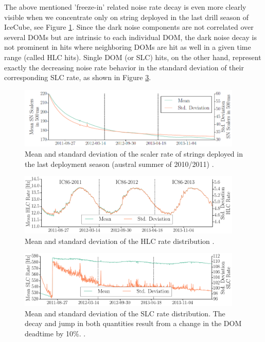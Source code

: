 The above mentioned 'freeze-in' related noise rate decay is even more clearly visible when we concentrate only on string deployed in the last drill season of IceCube, see Figure \ref{fig:noise_over_time_briedel_lastseasondepoyed}. Since the dark noise components are not correlated over several DOMs but are intrinsic to each individual DOM, the dark noise decay is not prominent in hits where neighboring DOMs are hit as well in a given time range (called HLC hits). Single DOM (or SLC) hits, on the other hand, represent exactly the decreasing noise rate behavior in the standard deviation of their corresponding SLC rate, as shown in Figure \ref{fig:slc_over_time_briedel}.

\begin{figure}[!h]
 \centering
 \includegraphics[width=0.95\textwidth]{graphics/dom/performance/darknoise/briedel4.png}
 \caption{Mean and standard deviation of the scaler rate of strings deployed in the last deployment season (austral summer of 2010/2011) \cite{briedel_phd}.}
 \label{fig:noise_over_time_briedel_lastseasondepoyed}
\end{figure}


\begin{figure}[!h]
 \centering
 \includegraphics[width=0.95\textwidth]{graphics/dom/performance/darknoise/briedel2.png}
 \caption{Mean and standard deviation of the HLC rate distribution \cite{briedel_phd}.}
 \label{fig:hlc_over_time_briedel}
\end{figure}

\begin{figure}[!h]
 \centering
 \includegraphics[width=0.95\textwidth]{graphics/dom/performance/darknoise/briedel3.png}
 \caption{Mean and standard deviation of the SLC rate distribution. The decay and jump in both quantities result from a change in the DOM deadtime by 10\%. \cite{briedel_phd}.}
 \label{fig:slc_over_time_briedel}
\end{figure}

